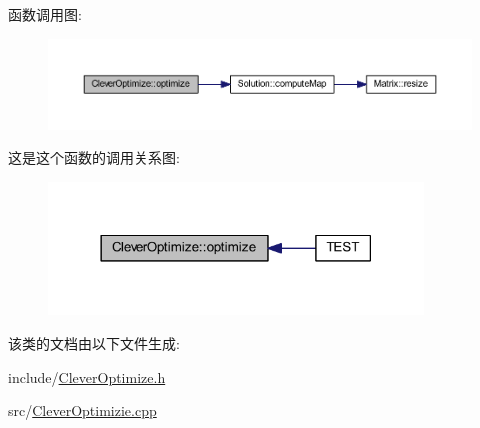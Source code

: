 函数调用图\+:
\nopagebreak
\begin{figure}[H]
\begin{center}
\leavevmode
\includegraphics[width=350pt]{classCleverOptimize_ab3cc46af7f8e30d264c2f737870ab9e6_cgraph}
\end{center}
\end{figure}




这是这个函数的调用关系图\+:
\nopagebreak
\begin{figure}[H]
\begin{center}
\leavevmode
\includegraphics[width=282pt]{classCleverOptimize_ab3cc46af7f8e30d264c2f737870ab9e6_icgraph}
\end{center}
\end{figure}




该类的文档由以下文件生成\+:\begin{DoxyCompactItemize}
\item 
include/\hyperlink{CleverOptimize_8h}{Clever\+Optimize.\+h}\item 
src/\hyperlink{CleverOptimizie_8cpp}{Clever\+Optimizie.\+cpp}\end{DoxyCompactItemize}
